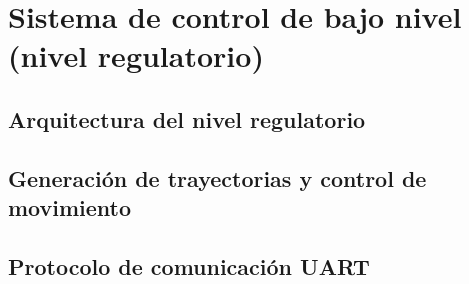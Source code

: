 \documentclass[a4paper,12pt]{report}
\begin{document}







\section{Sistema de control de bajo nivel (nivel regulatorio)}

\subsection{Arquitectura del nivel regulatorio}


% 
% 
% 

% 
% 

\subsection{Generación de trayectorias y control de movimiento}




\subsection{Protocolo de comunicación UART}


\end{document}
